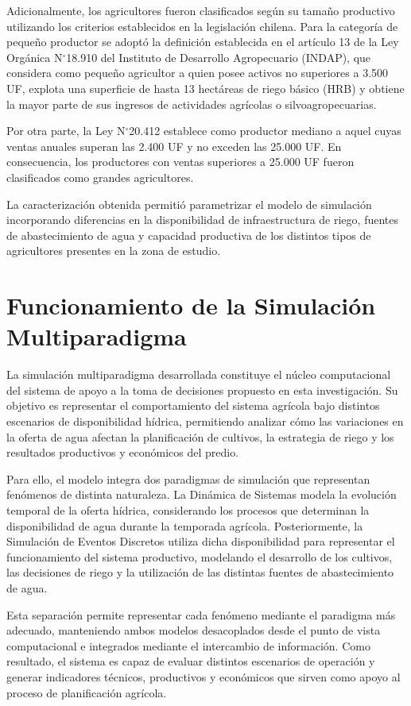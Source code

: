\documentclass[12pt]{report}
\begin{document}
Adicionalmente, los agricultores fueron clasificados según su tamaño productivo utilizando los criterios establecidos en la legislación chilena. Para la categoría de pequeño productor se adoptó la definición establecida en el artículo 13 de la Ley Orgánica N$^\circ$18.910 del Instituto de Desarrollo Agropecuario (INDAP), que considera como pequeño agricultor a quien posee activos no superiores a 3.500 UF, explota una superficie de hasta 13 hectáreas de riego básico (HRB) y obtiene la mayor parte de sus ingresos de actividades agrícolas o silvoagropecuarias.

Por otra parte, la Ley N$^\circ$20.412 establece como productor mediano a aquel cuyas ventas anuales superan las 2.400 UF y no exceden las 25.000 UF. En consecuencia, los productores con ventas superiores a 25.000 UF fueron clasificados como grandes agricultores.

La caracterización obtenida permitió parametrizar el modelo de simulación incorporando diferencias en la disponibilidad de infraestructura de riego, fuentes de abastecimiento de agua y capacidad productiva de los distintos tipos de agricultores presentes en la zona de estudio.


\section{Funcionamiento de la Simulación Multiparadigma}

La simulación multiparadigma desarrollada constituye el núcleo computacional del sistema de apoyo a la toma de decisiones propuesto en esta investigación. Su objetivo es representar el comportamiento del sistema agrícola bajo distintos escenarios de disponibilidad hídrica, permitiendo analizar cómo las variaciones en la oferta de agua afectan la planificación de cultivos, la estrategia de riego y los resultados productivos y económicos del predio.

Para ello, el modelo integra dos paradigmas de simulación que representan fenómenos de distinta naturaleza. La Dinámica de Sistemas modela la evolución temporal de la oferta hídrica, considerando los procesos que determinan la disponibilidad de agua durante la temporada agrícola. Posteriormente, la Simulación de Eventos Discretos utiliza dicha disponibilidad para representar el funcionamiento del sistema productivo, modelando el desarrollo de los cultivos, las decisiones de riego y la utilización de las distintas fuentes de abastecimiento de agua.

Esta separación permite representar cada fenómeno mediante el paradigma más adecuado, manteniendo ambos modelos desacoplados desde el punto de vista computacional e integrados mediante el intercambio de información. Como resultado, el sistema es capaz de evaluar distintos escenarios de operación y generar indicadores técnicos, productivos y económicos que sirven como apoyo al proceso de planificación agrícola.
\end{document}
